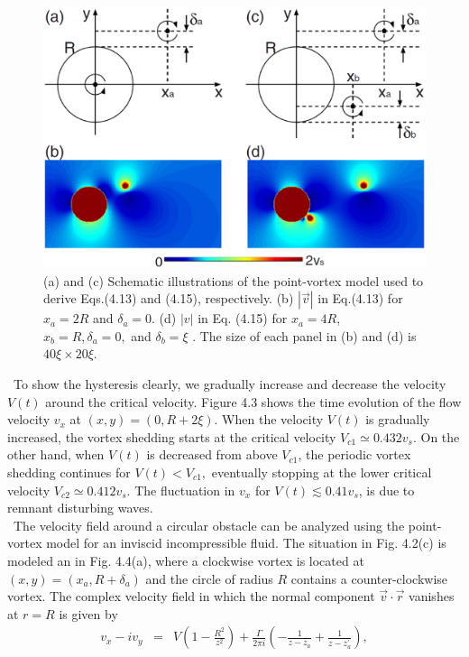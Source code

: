 \documentclass[12pt,a4paper]{report} %
\begin{document}
\begin{figure}[htbp]
\begin{center}
\includegraphics[scale=0.30, keepaspectratio]{4-4.eps}
\caption{
(a) and (c) Schematic illustrations of the point-vortex
model used to derive Eqs.(4.13) and (4.15), respectively. (b) $|\vec{v}|$
in Eq.(4.13) for $x_a = 2R$ and $\delta_a = 0$. (d) $|v|$ in Eq. (4.15) for $x_a = 4R$,
$x_b = R, \delta_a = 0,$ and $\delta_b = \xi$ . The size of each panel in (b) and (d) is
$40 \xi \times 20 \xi$.
}
\label{FIG:4-4}
\end{center}
\end{figure}
\ To show the hysteresis clearly, we gradually increase
and decrease the velocity $V(t)$ around the critical
velocity. Figure 4.3 shows the time evolution of the flow 
velocity $v_x$ at $(x,y) = (0, R+2\xi)$. When the velocity $V(t)$
is gradually increased, the vortex shedding starts at the critical
velocity $V_{c1} \simeq 0.432 v_s$. On the other hand, when $V(t)$
is decreased from above $V_{c1}$, the periodic vortex shedding
continues for $V(t) < V_{c1},$ eventually stopping at the
lower critical velocity $V_{c2} \simeq 0.412 v_s$. The fluctuation
in $v_x$ for $V(t) \lesssim 0.41 v_s$, is due to remnant disturbing
waves.
\\
\ The velocity field around a circular obstacle can be
analyzed using the point-vortex model for an inviscid 
incompressible fluid. The situation in Fig. 4.2(c) is modeled
an in Fig. 4.4(a), where a clockwise vortex is located at
$(x,y)=(x_a, R+\delta_a)$ and the circle of radius $R$
contains a counter-clockwise vortex. The complex velocity
field in which the normal component $\vec{v} \cdot \vec{r}$
vanishes at $r = R$ is given by
\begin{eqnarray}
v_x - iv_y & = &
V \left( 1 - \frac{R^2}{z^2} \right)
+ \frac{\Gamma}{2 \pi i}
\left( - \frac{1}{z - z_a} + \frac{1}{z - z^\prime_a} \right),
\end{eqnarray}
\end{document}
